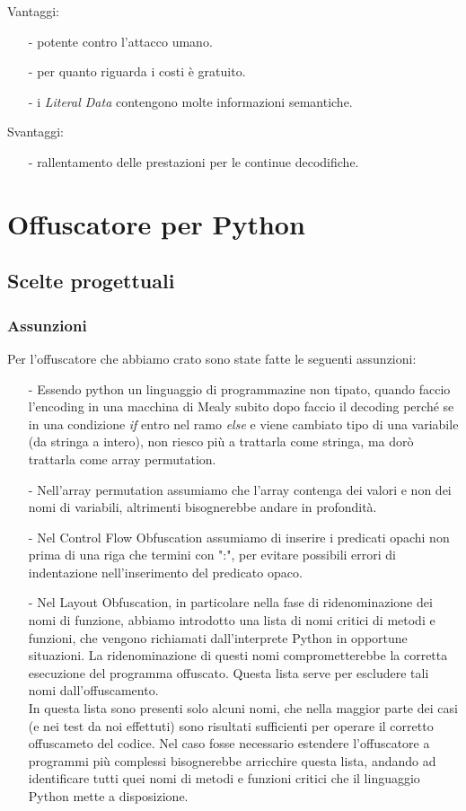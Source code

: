 \documentclass[a4paper,oneside,openright,titlepage,10pt,footinclude,headinclude]{scrbook}
\begin{document}
Vantaggi: 
\begin{itemize}
\item[-] potente contro l'attacco umano.
\item[-] per quanto riguarda i costi è gratuito.
\item[-] i \textit{Literal Data} contengono molte informazioni semantiche.
\end{itemize}

Svantaggi:
\begin{itemize}
\item[-] rallentamento delle prestazioni per le continue decodifiche.
\end{itemize}
 

\chapter{Offuscatore per Python}\label{offuscatore}

\section{Scelte progettuali}\label{offuscatore_scelte}


\subsection{Assunzioni}
Per l'offuscatore che abbiamo crato sono state fatte le seguenti assunzioni:
\begin{itemize}
\item[-] Essendo python un linguaggio di programmazine non tipato, quando faccio l'encoding in una macchina di Mealy subito dopo faccio il decoding perché se in una condizione \textit{if} entro nel ramo \textit{else} e viene cambiato tipo di una variabile (da stringa a intero), non riesco più a trattarla come stringa, ma dorò trattarla come array permutation.
\item[-] Nell'array permutation assumiamo che l'array contenga dei valori e non dei nomi di variabili, altrimenti bisognerebbe andare in profondità.
\item[-] Nel Control Flow Obfuscation assumiamo di inserire i predicati opachi non prima di una riga che termini con ":", per evitare possibili errori di indentazione nell'inserimento del predicato opaco.
\item[-] Nel Layout Obfuscation, in particolare nella fase di ridenominazione dei nomi di funzione, abbiamo introdotto una lista di nomi critici di metodi e funzioni, che vengono richiamati dall’interprete Python in opportune situazioni. La ridenominazione di questi nomi comprometterebbe la corretta esecuzione del programma offuscato. Questa lista serve per escludere tali nomi dall'offuscamento.\\
In questa lista sono presenti solo alcuni nomi, che nella maggior parte dei casi (e nei test da noi effettuti) sono risultati sufficienti per operare il corretto offuscameto del codice. Nel caso fosse necessario estendere l'offuscatore a programmi più complessi bisognerebbe arricchire questa lista, andando ad identificare tutti quei nomi di metodi e funzioni critici che il linguaggio Python mette a disposizione.
\end{itemize}   
\end{document}
